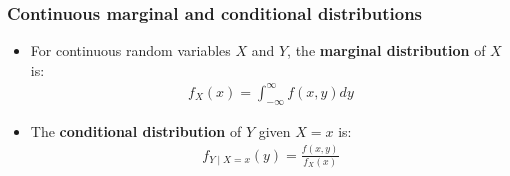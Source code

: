 \documentclass[handout]{beamer}\usepackage{graphicx, color}
\numberwithin{equation}{section}
\begin{document}
\begin{frame}
\frametitle{Continuous marginal and conditional distributions}
\begin{itemize}
\pause \item For continuous random variables $X$ and $Y$, the {\bf marginal distribution} of $X$ is:
\pause \begin{align*}
f_X(x) = \int_{-\infty}^\infty f(x,y) dy
\end{align*}
\pause \item The {\bf conditional distribution} of $Y$ given $X = x$ is:
\pause \begin{align*}
f_{Y \mid X = x}(y) = \frac{f(x,y)}{f_X(x)}
\end{align*}
\end{itemize}
\end{frame}
\end{document}
